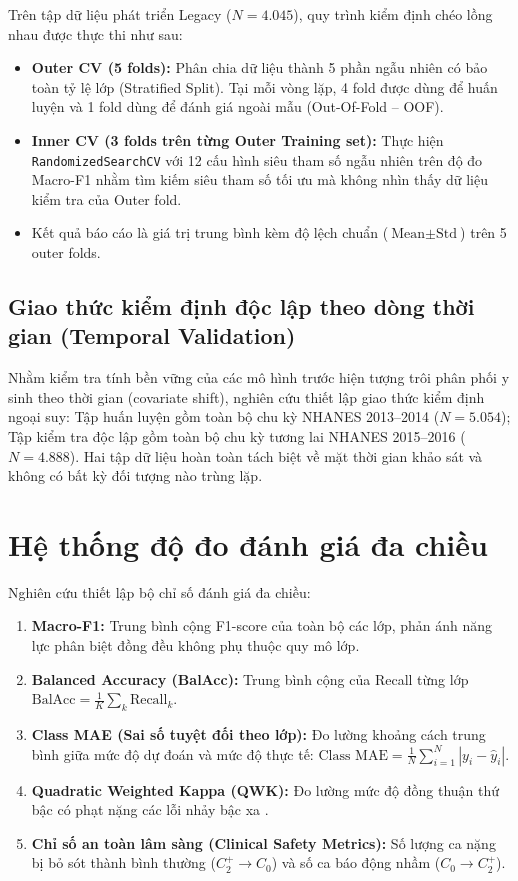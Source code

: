 Trên tập dữ liệu phát triển Legacy ($N = 4.045$), quy trình kiểm định chéo lồng nhau được thực thi như sau:
\begin{itemize}
    \item \textbf{Outer CV (5 folds):} Phân chia dữ liệu thành 5 phần ngẫu nhiên có bảo toàn tỷ lệ lớp (Stratified Split). Tại mỗi vòng lặp, 4 fold được dùng để huấn luyện và 1 fold dùng để đánh giá ngoài mẫu (Out-Of-Fold -- OOF).
    \item \textbf{Inner CV (3 folds trên từng Outer Training set):} Thực hiện \texttt{RandomizedSearchCV} với 12 cấu hình siêu tham số ngẫu nhiên trên độ đo Macro-F1 nhằm tìm kiếm siêu tham số tối ưu mà không nhìn thấy dữ liệu kiểm tra của Outer fold.
    \item Kết quả báo cáo là giá trị trung bình kèm độ lệch chuẩn ($\text{Mean} \pm \text{Std}$) trên 5 outer folds.
\end{itemize}

\subsection{Giao thức kiểm định độc lập theo dòng thời gian (Temporal Validation)}
\label{subsec:temporal-protocol}

Nhằm kiểm tra tính bền vững của các mô hình trước hiện tượng trôi phân phối y sinh theo thời gian (covariate shift), nghiên cứu thiết lập giao thức kiểm định ngoại suy: Tập huấn luyện gồm toàn bộ chu kỳ NHANES 2013--2014 ($N = 5.054$); Tập kiểm tra độc lập gồm toàn bộ chu kỳ tương lai NHANES 2015--2016 ($N = 4.888$). Hai tập dữ liệu hoàn toàn tách biệt về mặt thời gian khảo sát và không có bất kỳ đối tượng nào trùng lặp.

\section{Hệ thống độ đo đánh giá đa chiều}
\label{sec:he-thong-do-do}

Nghiên cứu thiết lập bộ chỉ số đánh giá đa chiều:
\begin{enumerate}
    \item \textbf{Macro-F1:} Trung bình cộng F1-score của toàn bộ các lớp, phản ánh năng lực phân biệt đồng đều không phụ thuộc quy mô lớp.
    \item \textbf{Balanced Accuracy (BalAcc):} Trung bình cộng của Recall từng lớp $\text{BalAcc} = \frac{1}{K}\sum_k \text{Recall}_k$.
    \item \textbf{Class MAE (Sai số tuyệt đối theo lớp):} Đo lường khoảng cách trung bình giữa mức độ dự đoán và mức độ thực tế: $\text{Class MAE} = \frac{1}{N} \sum_{i=1}^N |y_i - \hat{y}_i|$.
    \item \textbf{Quadratic Weighted Kappa (QWK):} Đo lường mức độ đồng thuận thứ bậc có phạt nặng các lỗi nhảy bậc xa \cite{cohen1968weighted}.
    \item \textbf{Chỉ số an toàn lâm sàng (Clinical Safety Metrics):} Số lượng ca nặng bị bỏ sót thành bình thường ($C_2^+ \to C_0$) và số ca báo động nhầm ($C_0 \to C_2^+$).
\end{enumerate}

